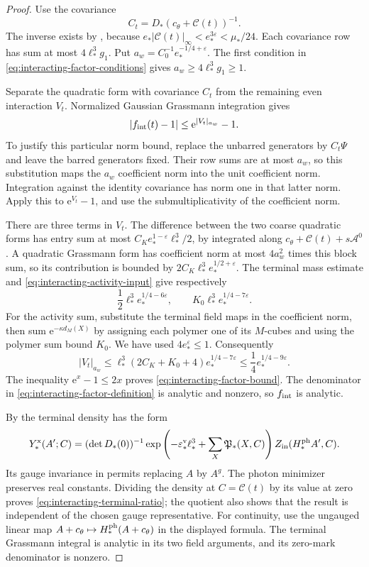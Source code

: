 \documentclass[11pt,letterpaper,reqno]{amsart}
\begin{document}
\begin{proof}
Use the covariance
\[
 C_t=D_*(c_\theta+\mathscr C(t))^{-1}.
\]
The inverse exists by
\cite[(75)]{TerminalPressure}, because
$e_*|\mathscr C(t)|_\infty<e_*^{3\varepsilon}
<\mu_*/24$. Each covariance row has sum at
most $4\ell_*^3g_1$. Put
$a_w=C_0^{-1}e_*^{-1/4+\varepsilon}$.
The first condition in
\eqref{eq:interacting-factor-conditions} gives
$a_w\ge4\ell_*^3g_1\ge1$.

Separate the quadratic form with covariance $C_t$
from the remaining even interaction $V_t$.
Normalized Gaussian Grassmann integration gives
\begin{equation}\label{eq:interacting-crude-Gaussian}
 |f_{\rm int}(t)-1|\le \mathrm e^{|V_t|_{a_w}}-1.
\end{equation}
To justify this particular norm bound, replace
the unbarred generators by $C_t\Psi$ and leave
the barred generators fixed. Their row sums
are at most $a_w$, so this substitution maps
the $a_w$ coefficient norm into the unit
coefficient norm. Integration against the identity
covariance has norm one in that latter norm.
Apply this to $\mathrm e^{V_t}-1$, and use the
submultiplicativity of the coefficient norm.

There are three terms in $V_t$. The difference
between the two coarse quadratic forms has
entry sum at most
$C_Ke_*^{1-\varepsilon}\ell_*^3/2$, by
\cite[(66)]{TerminalPressure} integrated along
$c_\theta+\mathscr C(t)+s\mathscr A^0$.
A quadratic Grassmann form has coefficient norm
at most $4a_w^2$ times this block sum, so
its contribution is bounded by
$2C_K\ell_*^3e_*^{1/2+\varepsilon}$.
The terminal mass estimate and
\eqref{eq:interacting-activity-input} give respectively
\[
 \frac12\ell_*^3e_*^{1/4-6\varepsilon},
 \qquad K_0\ell_*^3e_*^{1/4-7\varepsilon}.
\]
For the activity sum, substitute the terminal
field maps in the coefficient norm, then sum
$\mathrm e^{-\kappa d_M(X)}$ by assigning each polymer
one of its $M$-cubes and using the polymer
sum bound $K_0$. We have used
$4e_*^\varepsilon\le1$.
Consequently
\[
 |V_t|_{a_w}\le
 \ell_*^3(2C_K+K_0+4)e_*^{1/4-7\varepsilon}
 \le\frac14e_*^{1/4-9\varepsilon}.
\]
The inequality $\mathrm e^x-1\le2x$ proves
\eqref{eq:interacting-factor-bound}.
The denominator in \eqref{eq:interacting-factor-definition}
is analytic and nonzero, so $f_{\rm int}$ is analytic.

By \cite[(16)]{TerminalPressure} the terminal density has the form
\[
 Y_*^{\rm x}(A';C)=
 (\det D_*(0))^{-1}
 \exp\left(-\varepsilon_*^{\rm v}\ell_*^3+
                         \sum_X\mathfrak P_*(X,C)\right)
 Z_{\rm in}(H_*^{\rm ph}A',C).
\]
Its gauge invariance in \cite[Theorem~B]{TerminalPressure}
permits replacing $A$ by
$A^g$. The photon minimizer preserves real
constants. Dividing the density at $C=\mathscr C(t)$
by its value at zero proves
\eqref{eq:interacting-terminal-ratio}; the quotient
also shows that the result is independent of
the chosen gauge representative. For continuity,
use the ungauged linear map
$A+c_\theta\mapsto H_*^{\rm ph}(A+c_\theta)$
in the displayed formula. The terminal Grassmann
integral is analytic in its two field arguments,
and its zero-mark denominator is nonzero.


\end{proof}
\end{document}
